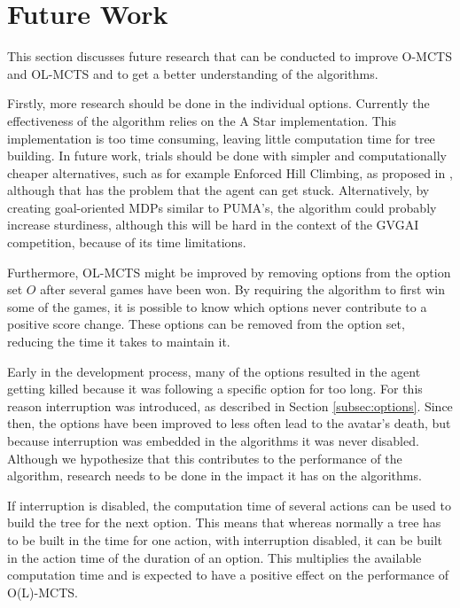 \section{Future Work}
This section discusses future research that can be conducted to improve O-MCTS
and OL-MCTS and to get a better understanding of the algorithms. 

Firstly, more research should be done in the individual options. Currently the
effectiveness of the algorithm relies on the A Star implementation.  This
implementation is too time consuming, leaving little computation time for tree
building. In future work, trials should be done with simpler and computationally
cheaper alternatives, such as for example Enforced Hill Climbing, as proposed in
\cite{ross2014general}, although that has the problem that the agent can get
stuck. Alternatively, by creating goal-oriented MDPs similar to PUMA's, the
algorithm could probably increase sturdiness, although this will be hard in the
context of the GVGAI competition, because of its time limitations.

Furthermore, OL-MCTS might be improved by removing options from the option set
$O$ after several games have been won. By requiring the algorithm to first win
some of the games, it is possible to know which options never contribute to a
positive score change. These options can be removed from the option set,
reducing the time it takes to maintain it.

Early in the development process, many of the options resulted in the agent
getting killed because it was following a specific option for too long. For this
reason interruption was introduced, as described in Section
\ref{subsec:options}. Since then, the options have been improved to less often
lead to the avatar's death, but because interruption was embedded in the
algorithms it was never disabled.  Although we hypothesize that this contributes
to the performance of the algorithm, research needs to be done in the impact it
has on the algorithms.

If interruption is disabled, the computation time of several actions can be
used to build the tree for the next option. This means that whereas normally a
tree has to be built in the time for one action, with interruption disabled, it
can be built in the action time of the duration of an option. This multiplies
the available computation time and is expected to have a positive effect on the
performance of O(L)-MCTS.

